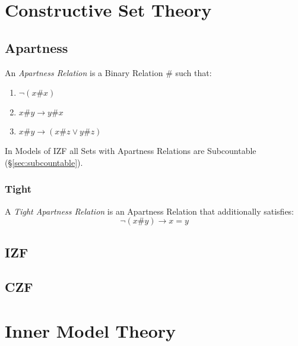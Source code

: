 \section{Constructive Set Theory}\label{sec:constructive_set_theory}

\subsection{Apartness}\label{sec:apartness}

An \emph{Apartness Relation} is a Binary Relation $\#$ such that:

\begin{enumerate}
\item $\neg (x\#x)$
\item $x\#y \rightarrow y\#x$
\item $x\#y \rightarrow (x\#z \vee y\#z)$
\end{enumerate}

In Models of IZF all Sets with Apartness Relations are Subcountable
(\S\ref{sec:subcountable}).



\subsubsection{Tight}\label{sec:tight}

A \emph{Tight Apartness Relation} is an Apartness Relation that
additionally satisfies:
\[
  \neg (x \# y) \rightarrow x = y
\]



\subsection{IZF}\label{sec:izf}

\subsection{CZF}\label{sec:czf}



\section{Inner Model Theory}\label{sec:inner_model_theory}
